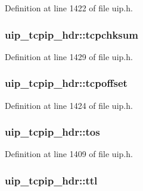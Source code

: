 Definition at line 1422 of file uip.h.

\hypertarget{structuip__tcpip__hdr_af4a1d8cfbe270393a2de02b0c743e474}{
\subsubsection[{tcpchksum}]{ {\bf uip\_\-tcpip\_\-hdr::tcpchksum}}}
\label{structuip__tcpip__hdr_af4a1d8cfbe270393a2de02b0c743e474}


Definition at line 1429 of file uip.h.

\hypertarget{structuip__tcpip__hdr_a6af8a59d0ab8967aacea749d6e59ac90}{
\subsubsection[{tcpoffset}]{ {\bf uip\_\-tcpip\_\-hdr::tcpoffset}}}
\label{structuip__tcpip__hdr_a6af8a59d0ab8967aacea749d6e59ac90}


Definition at line 1424 of file uip.h.

\hypertarget{structuip__tcpip__hdr_a8cf0ca17b115ff2e3071b3fabcc43b53}{
\subsubsection[{tos}]{ {\bf uip\_\-tcpip\_\-hdr::tos}}}
\label{structuip__tcpip__hdr_a8cf0ca17b115ff2e3071b3fabcc43b53}


Definition at line 1409 of file uip.h.

\hypertarget{structuip__tcpip__hdr_a0f27e16ddcf7199d514968204966f559}{
\subsubsection[{ttl}]{ {\bf uip\_\-tcpip\_\-hdr::ttl}}}
\label{structuip__tcpip__hdr_a0f27e16ddcf7199d514968204966f559}


